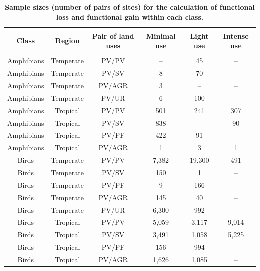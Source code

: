 \clearpage
\newpage

\begin{table}[!htbp]
\renewcommand{\baselinestretch}{1}
\renewcommand{\arraystretch}{1.2}
\begin{center}\fontsize{9}{11}\selectfont
  \caption[Sample sizes (number of pairs of sites) for the calculation of functional loss and functional gain within each class]{\textbf{Sample sizes (number of pairs of sites) for the calculation of functional loss and functional gain within each class.}}
  \label{SI3_Table5} 
\begin{tabular}{@{\extracolsep{5pt}} cccccc} 
\\[-1.8ex]\hline 
\hline \\[-1.8ex] 
\textbf{Class} & \textbf{Region} & \textbf{Pair of land uses} & \textbf{Minimal use} & \textbf{Light use} & \textbf{Intense use}\\ 
\hline \\[-1.8ex] 
Amphibians & Temperate & PV/PV & -- & 45 & -- \\ 
Amphibians & Temperate & PV/SV & 8 & 70 & -- \\ 
Amphibians & Temperate & PV/AGR & 3 & -- & -- \\ 
Amphibians & Temperate & PV/UR & 6 & 100 & -- \\ 
Amphibians & Tropical & PV/PV & 501 & 241 & 307 \\ 
Amphibians & Tropical & PV/SV & 838 & -- & 90 \\ 
Amphibians & Tropical & PV/PF & 422 & 91 & -- \\ 
Amphibians & Tropical & PV/AGR & 1 & 3 & 1 \\ 
Birds & Temperate & PV/PV & 7,382 & 19,300 & 491 \\ 
Birds & Temperate & PV/SV & 150 & 1 & -- \\ 
Birds & Temperate & PV/PF & 9 & 166 & -- \\ 
Birds & Temperate & PV/AGR & 145 & 40 & -- \\ 
Birds & Temperate & PV/UR & 6,300 & 992 & -- \\ 
Birds & Tropical & PV/PV & 5,059 & 3,117 & 9,014 \\ 
Birds & Tropical & PV/SV & 3,491 & 1,058 & 5,225 \\ 
Birds & Tropical & PV/PF & 156 & 994 & -- \\ 
Birds & Tropical & PV/AGR & 1,626 & 1,085 & -- \\ 

\end{tabular}
\end{center}
\end{table}
